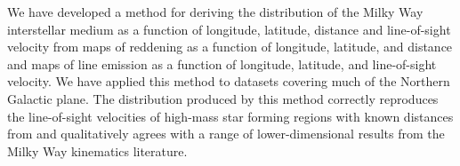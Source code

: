 We have developed a method for deriving the distribution of the Milky Way interstellar medium as a function of longitude, latitude, distance and line-of-sight velocity from maps of reddening as a function of longitude, latitude, and distance and maps of line emission as a function of longitude, latitude, and line-of-sight velocity.   We have applied this method to datasets covering much of the Northern Galactic plane.  The distribution produced by this method correctly reproduces the line-of-sight velocities of high-mass star forming regions with known distances from \citet{Reid:2014km} and qualitatively agrees with a range of lower-dimensional results from the Milky Way kinematics literature. 